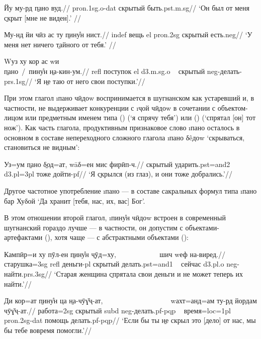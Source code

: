\begingl
\gla Йу му-рд \b{пано} вуд.//
 {\sc pron.1sg.o-dat} скрытый быть.{\sc pst.m.sg}//
\glft ‘Он был от меня \b{скрыт} [мне не виден].’ //
\endgl \xe

\begingl
\gla Му-нд йи чӣз ас ту \b{пину̊н} нист.//
 {\sc indef} вещь {\sc el} {\sc pron.2sg} скрытый есть.{\sc neg}//
\glft ‘У меня нет ничего \b{тайного} от тебя.’ //
\endgl \xe

\begingl
\gla Wуз ху кор ас wи ~~~~~~~~~~~~~~~~~~~~~~~~~~~~~~~~~~~~~~~~~~~~~~~~~~~~~~ \b{пано~/~пину̊н} \b{на-кин-ум}.//
 {\sc refl} поступок {\sc el} {\sc d3.m.sg.o} ~ скрытый {\sc neg}-делать-{\sc prs.1sg}//
\glft ‘Я \b{не таю} от него свои поступки.’//
\endgl \xe

При этом глагол \i{пано чӣдоw} воспринимается в шугнанском как устаревший и, в частности, не выдерживает конкуренции с \i{ҷой чӣдоw} в сочетании с объектом-лицом или предметным именем типа () (‘я спрячу тебя’) или () (‘спрятал [он] тот нож’). Как часть глагола, продуктивным признаковое слово \i{пано} осталось в основном в составе непереходного сложного глагола \i{пано δêдоw} ‘скрываться, становиться не видным’:

\begingl
\gla Уз=ум \b{пано} \b{δод}=ат, wāδ=ен мис фирӣп-ч.//
 скрытый ударить.{\sc pst=and2} {\sc d3.pl=3pl} тоже дойти-{\sc pf}//
\glft ‘Я \b{скрылся} (из глаз), и они тоже добрались.’//
\endgl \xe

Другое частотное употребление \i{пано} — в составе сакральных формул типа \i{пано бар Хуδой} ‘Да хранит [тебя, нас, их, вас] Бог’.

В этом отношении второй глагол, \i{пину̊н чӣдоw} встроен в современный шугнанский гораздо лучше — в частности, он допустим с объектами-артефактами (), хотя чаще — с абстрактными объектами ():

\begingl
\gla Кампӣр=и ху пӯл-ен \b{пину̊н} \b{чӯд}=ху, ~~~~~~~~~~~ шич wеф на-виред.//
\glc старушка={\sc 3sg} {\sc refl} деньги-{\sc pl} скрытый делать.{\sc pst=and1} ~ сейчас {\sc d3.pl.o} {\sc neg}-найти.{\sc prs.3sg}//
\glft ‘Старая женщина \b{спрятала} свои деньги и не может теперь их найти.’//
\endgl \xe

\begingl
\gla Ди кор=ат \b{пину̊н} ца \b{на-чӯɣ̌ҷ-ат}, ~~~~~~~~~~~~~~~~~~ wахт=анд=ам ту-рд йордам чӯɣ̌ҷ-ат.//
 работа={\sc 2sg} скрытый {\sc subd} {\sc neg}-делать.{\sc pf-pqp} ~ время={\sc loc=1pl} {\sc pron.2sg-dat} помощь делать.{\sc pf-pqp}//
\glft ‘Если бы ты \b{не скрыл} это [дело] от нас, мы бы тебе вовремя помогли.’//
\endgl \xe

